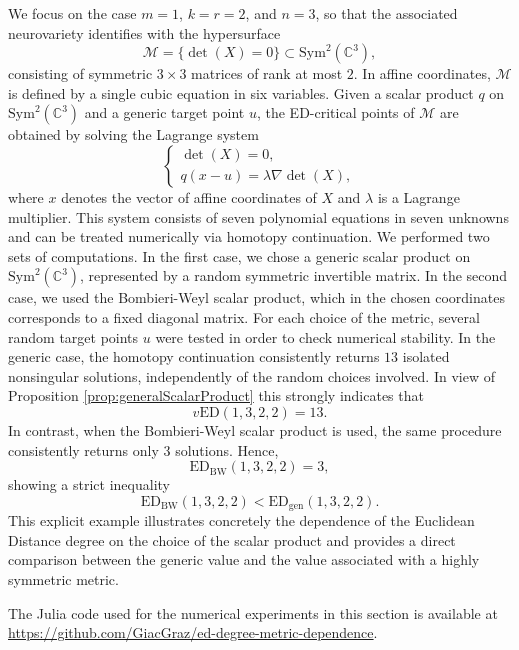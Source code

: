 \documentclass[11pt]{article}
\numberwithin{equation}{section}
\numberwithin{figure}{section}
\theoremstyle{plain}
\theoremstyle{definition}
\theoremstyle{remark}
\newcommand{\Sym}{\mathrm{Sym}}
\newcommand{\ED}{\mathrm{ED}}
\newcommand{\vED}{v\mathrm{ED}}
\begin{document}
We focus on the case $m=1$, $k=r=2$, and $n=3$, so that the associated neurovariety
identifies with the hypersurface
\[
\mathcal{M} = \{ \det(X)=0 \} \subset \Sym^2(\mathbb{C}^3),
\]
consisting of symmetric $3\times3$ matrices of rank at most $2$.
In affine coordinates, $\mathcal{M}$ is defined by a single cubic equation in six variables.
Given a scalar product $q$ on $\Sym^2(\mathbb{C}^3)$ and a generic target point $u$,
the ED-critical points of $\mathcal{M}$ are obtained by solving the Lagrange system
\[
\begin{cases}
\det(X)=0, \\
q(x-u) = \lambda \nabla \det(X),
\end{cases}
\]
where $x$ denotes the vector of affine coordinates of $X$ and $\lambda$ is a Lagrange multiplier.
This system consists of seven polynomial equations in seven unknowns and can be treated
numerically via homotopy continuation.
We performed two sets of computations.
In the first case, we chose a generic scalar product on $\Sym^2(\mathbb{C}^3)$, represented
by a random symmetric invertible matrix.
In the second case, we used the Bombieri-Weyl scalar product, which in the chosen coordinates
corresponds to a fixed diagonal matrix.
For each choice of the metric, several random target points $u$ were tested in order to
check numerical stability.
In the generic case, the homotopy continuation consistently returns $13$ isolated nonsingular
solutions, independently of the random choices involved. In view of Proposition \ref{prop:generalScalarProduct} this strongly indicates that
\[
\vED(1,3,2,2)=13.
\]
In contrast, when the Bombieri-Weyl scalar product is used, the same procedure consistently
returns only $3$ solutions. Hence,
\[
\ED_{\mathrm{BW}}(1,3,2,2)=3,
\]
showing a strict inequality
\[
\ED_{\mathrm{BW}}(1,3,2,2) < \ED_{\mathrm{gen}}(1,3,2,2).
\]
This explicit example illustrates concretely the dependence of the Euclidean Distance degree
on the choice of the scalar product and provides a direct comparison between the generic
value and the value associated with a highly symmetric metric.

The Julia code used for the numerical experiments in this section is available at
\url{https://github.com/GiacGraz/ed-degree-metric-dependence}.

\newpage



\end{document}
